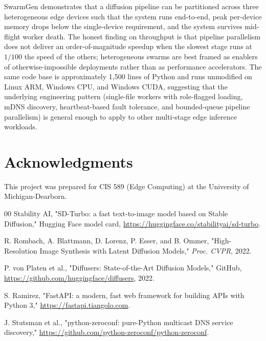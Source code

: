 \documentclass[conference]{IEEEtran}
\begin{document}
SwarmGen demonstrates that a diffusion pipeline can be partitioned across
three heterogeneous edge devices such that the system runs end-to-end,
peak per-device memory drops below the single-device requirement, and the
system survives mid-flight worker death. The honest finding on throughput
is that pipeline parallelism does not deliver an order-of-magnitude
speedup when the slowest stage runs at $1/100$ the speed of the others;
heterogeneous swarms are best framed as enablers of otherwise-impossible
deployments rather than as performance accelerators. The same code base
is approximately 1{,}500 lines of Python and runs unmodified on Linux ARM,
Windows CPU, and Windows CUDA, suggesting that the underlying engineering
pattern (single-file workers with role-flagged loading, mDNS discovery,
heartbeat-based fault tolerance, and bounded-queue pipeline parallelism)
is general enough to apply to other multi-stage edge inference workloads.

\section*{Acknowledgments}
This project was prepared for CIS 589 (Edge Computing) at the University of
Michigan-Dearborn.

\begin{thebibliography}{00}
Stability AI, "SD-Turbo: a fast text-to-image model based on Stable
Diffusion," Hugging Face model card, \url{https://huggingface.co/stabilityai/sd-turbo}.

R. Rombach, A. Blattmann, D. Lorenz, P. Esser, and B. Ommer,
"High-Resolution Image Synthesis with Latent Diffusion Models,"
\textit{Proc. CVPR}, 2022.

P. von Platen et al., "Diffusers: State-of-the-Art Diffusion Models,"
GitHub, \url{https://github.com/huggingface/diffusers}, 2022.

S. Ramirez, "FastAPI: a modern, fast web framework for building APIs with
Python 3," \url{https://fastapi.tiangolo.com}.

J. Stutsman et al., "python-zeroconf: pure-Python multicast DNS service
discovery," \url{https://github.com/python-zeroconf/python-zeroconf}.
\end{thebibliography}
\end{document}
